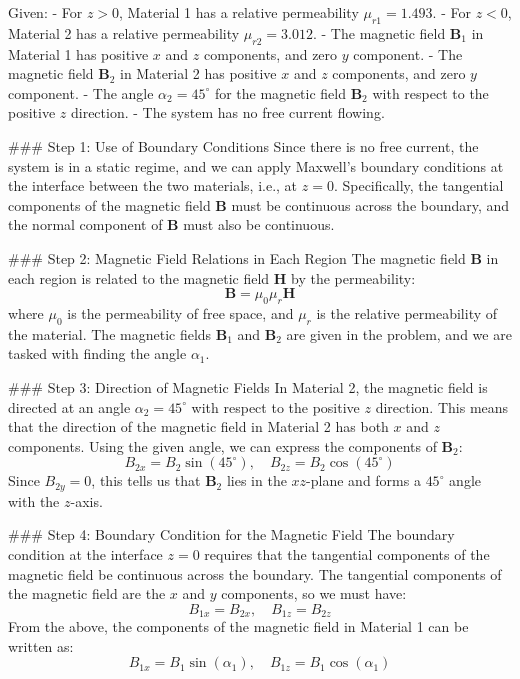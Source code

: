 \documentclass{article}
\begin{document}
Given:
- For $z > 0$, Material 1 has a relative permeability $\mu_{r1} = 1.493$.
- For $z < 0$, Material 2 has a relative permeability $\mu_{r2} = 3.012$.
- The magnetic field $\mathbf{B}_1$ in Material 1 has positive $x$ and $z$ components, and zero $y$ component.
- The magnetic field $\mathbf{B}_2$ in Material 2 has positive $x$ and $z$ components, and zero $y$ component.
- The angle $\alpha_2 = 45^\circ$ for the magnetic field $\mathbf{B}_2$ with respect to the positive $z$ direction.
- The system has no free current flowing.

### Step 1: Use of Boundary Conditions
Since there is no free current, the system is in a static regime, and we can apply Maxwell's boundary conditions at the interface between the two materials, i.e., at $z = 0$. Specifically, the tangential components of the magnetic field $\mathbf{B}$ must be continuous across the boundary, and the normal component of $\mathbf{B}$ must also be continuous.

### Step 2: Magnetic Field Relations in Each Region
The magnetic field $\mathbf{B}$ in each region is related to the magnetic field $\mathbf{H}$ by the permeability:
\[
\mathbf{B} = \mu_0 \mu_r \mathbf{H}
\]
where $\mu_0$ is the permeability of free space, and $\mu_r$ is the relative permeability of the material. The magnetic fields $\mathbf{B}_1$ and $\mathbf{B}_2$ are given in the problem, and we are tasked with finding the angle $\alpha_1$.

### Step 3: Direction of Magnetic Fields
In Material 2, the magnetic field is directed at an angle $\alpha_2 = 45^\circ$ with respect to the positive $z$ direction. This means that the direction of the magnetic field in Material 2 has both $x$ and $z$ components. Using the given angle, we can express the components of $\mathbf{B}_2$:
\[
B_{2x} = B_2 \sin(45^\circ), \quad B_{2z} = B_2 \cos(45^\circ)
\]
Since $B_{2y} = 0$, this tells us that $\mathbf{B}_2$ lies in the $xz$-plane and forms a $45^\circ$ angle with the $z$-axis.

### Step 4: Boundary Condition for the Magnetic Field
The boundary condition at the interface $z = 0$ requires that the tangential components of the magnetic field be continuous across the boundary. The tangential components of the magnetic field are the $x$ and $y$ components, so we must have:
\[
B_{1x} = B_{2x}, \quad B_{1z} = B_{2z}
\]
From the above, the components of the magnetic field in Material 1 can be written as:
\[
B_{1x} = B_1 \sin(\alpha_1), \quad B_{1z} = B_1 \cos(\alpha_1)
\]
\end{document}
